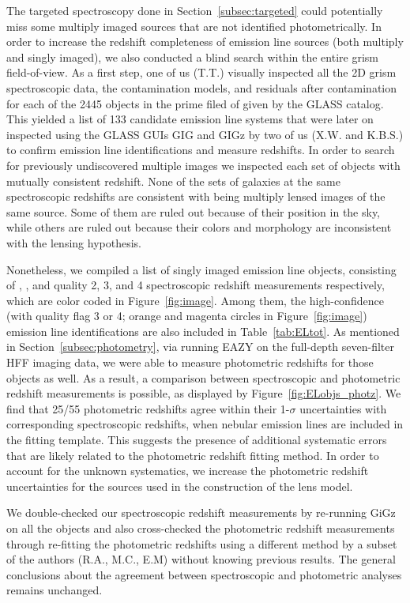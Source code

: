 The targeted spectroscopy done in Section~\ref{subsec:targeted} could
potentially miss some multiply imaged sources that are not identified
photometrically. In order to increase the redshift completeness of
emission line sources (both multiply and singly imaged), we also
conducted a blind search within the entire grism field-of-view. As a
first step, one of us (T.T.)  visually inspected all the 2D grism
spectroscopic data, the contamination models, and residuals after
contamination for each of the 2445 objects in the prime filed of \cler
given by the GLASS catalog.  This yielded a list of 133 candidate
emission line systems that were later on inspected using the GLASS
GUIs GIG and GIGz by two of us (X.W.  and K.B.S.) to confirm emission
line identifications and measure redshifts.  In order to search for
previously undiscovered multiple images we inspected each set of
objects with mutually consistent redshift.  None of the sets of
galaxies at the same spectroscopic redshifts are consistent with being
multiply lensed images of the same source. Some of them are ruled out
because of their position in the sky, while others are ruled out
because their colors and morphology are inconsistent with the lensing
hypothesis.

Nonetheless, we compiled a list of singly imaged emission line
objects, consisting of \NELQtwo{}, \NELQthree{}, and \NELQfour{}
quality 2, 3, and 4 spectroscopic redshift measurements respectively,
which are color coded in Figure~\ref{fig:image}. Among them, the
high-confidence (with quality flag 3 or 4; orange and magenta circles
in Figure~\ref{fig:image}) emission line identifications are also
included in Table~\ref{tab:ELtot}. As mentioned in
Section~\ref{subsec:photometry}, via running EAZY on the full-depth
seven-filter HFF imaging data, we were able to measure photometric
redshifts for those objects as well. As a result, a comparison between
spectroscopic and photometric redshift measurements is possible, as
displayed by Figure~\ref{fig:ELobjs_photz}. We find that 25/55
photometric redshifts agree within their 1-$\sigma$ uncertainties with
corresponding spectroscopic redshifts, when nebular emission lines are
included in the fitting template. This suggests the presence of
additional systematic errors that are likely related to the
photometric redshift fitting method. In order to account for the
unknown systematics, we increase the photometric redshift
uncertainties for the sources used in the construction of the lens
model.

We double-checked our spectroscopic redshift measurements by
re-running GiGz on all the objects and also cross-checked the photometric
redshift measurements through re-fitting the photometric redshifts
using a different method by a subset of the authors (R.A., M.C., E.M)
without knowing previous results. The general conclusions about the
agreement between spectroscopic and photometric analyses remains
unchanged.

